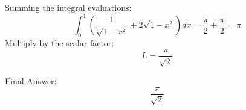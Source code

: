 \documentclass{article}
\begin{document}
Summing the integral evaluations:
\[
\int_{0}^{1} \left( \frac{1}{\sqrt{1-x^2}} + 2\sqrt{1-x^2} \right) dx = \frac{\pi}{2} + \frac{\pi}{2} = \pi
\]
Multiply by the scalar factor:
\[
L = \frac{\pi}{\sqrt{2}}
\]

Final Answer:
\[
\boxed{\frac{\pi}{\sqrt{2}}}
\]
\end{document}
